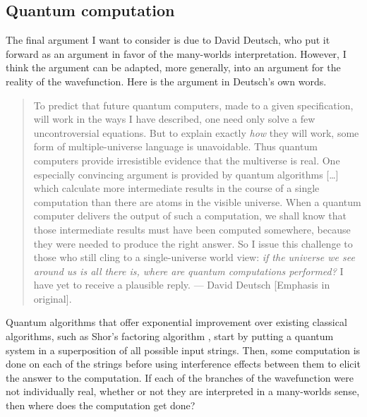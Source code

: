\documentclass[DIV=calc,fontsize=12pt]{scrartcl} %
\theoremstyle{definition}
\theoremstyle{plain}
\begin{document}
\subsection{Quantum computation}

\label{QC}

The final argument I want to consider is due to David Deutsch, who put
it forward as an argument in favor of the many-worlds interpretation.
However, I think the argument can be adapted, more generally, into an
argument for the reality of the wavefunction.  Here is the argument in
Deutsch's own words.

\begin{quote}
To predict that future quantum computers, made to a given
specification, will work in the ways I have described, one need only
solve a few uncontroversial equations. But to explain exactly
\emph{how} they will work, some form of multiple-universe language
is unavoidable. Thus quantum computers provide irresistible evidence
that the multiverse is real. One especially convincing argument is
provided by quantum algorithms [\ldots] which calculate more
intermediate results in the course of a single computation than
there are atoms in the visible universe. When a quantum computer
delivers the output of such a computation, we shall know that those
intermediate results must have been computed somewhere, because they
were needed to produce the right answer. So I issue this challenge
to those who still cling to a single-universe world view: \emph{if
the universe we see around us is all there is, where are quantum
computations performed?} I have yet to receive a plausible
reply. --- David Deutsch \cite{Deutsch1998} [Emphasis in original].
\end{quote}

Quantum algorithms that offer exponential improvement over existing
classical algorithms, such as Shor's factoring algorithm
\cite{Shor1997}, start by putting a quantum system in a superposition
of all possible input strings.  Then, some computation is done on each
of the strings before using interference effects between them to
elicit the answer to the computation.  If each of the branches of the
wavefunction were not individually real, whether or not they are
interpreted in a many-worlds sense, then where does the computation
get done?
\end{document}
